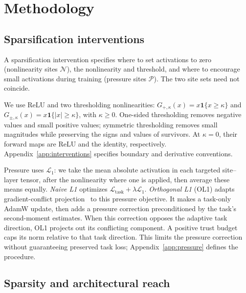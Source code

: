 \section{Methodology}
\label{sec:methodology}

\subsection{Sparsification interventions}
\label{sec:interventions}

A sparsification intervention specifies where to set activations to zero
(nonlinearity sites $\mathcal{N}$), the nonlinearity and threshold, and where to encourage
small activations during training (pressure sites $\mathcal{P}$). The two site
sets need not coincide.

We use ReLU and two thresholding nonlinearities:
$G_{+,\kappa}(x)=x\mathbf{1}\{x\geq\kappa\}$ and
$G_{\pm,\kappa}(x)=x\mathbf{1}\{|x|\geq\kappa\}$, with $\kappa\geq0$.
One-sided thresholding removes negative values and small positive values;
symmetric thresholding removes small magnitudes while preserving the signs
and values of survivors. At $\kappa=0$, their forward maps are ReLU and the
identity, respectively. Appendix~\ref{app:interventions} specifies boundary
and derivative conventions.

Pressure uses $\mathcal{L}_1$: we take the mean absolute activation in each
targeted site--layer tensor, after the nonlinearity where one is applied, then average these
means equally.
\emph{Naive L1} optimizes $\mathcal{L}_{\mathrm{task}}+\lambda\mathcal{L}_1$.
\emph{Orthogonal L1} (OL1) adapts gradient-conflict
projection~\citep{yu2020pcgrad,hsieh2024bloop} to this pressure objective.
It makes a task-only AdamW update, then adds a pressure
correction preconditioned by the task's second-moment estimates. When this
correction opposes the adaptive task direction, OL1 projects out its
conflicting component. A positive trust budget caps its norm relative to that task
direction. This limits the pressure correction without guaranteeing preserved task
loss; Appendix~\ref{app:pressure} defines the procedure.

\subsection{Sparsity and architectural reach}
\label{sec:measurement}


